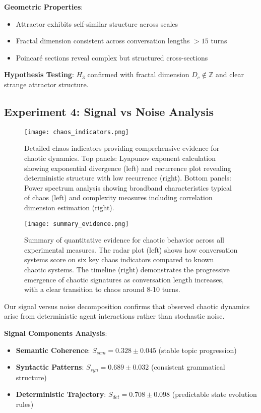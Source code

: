 \documentclass[11pt,a4paper]{article}
\begin{document}
\textbf{Geometric Properties}:
\begin{itemize}
    \item Attractor exhibits self-similar structure across scales
    \item Fractal dimension consistent across conversation lengths $> 15$ turns
    \item Poincaré sections reveal complex but structured cross-sections
\end{itemize}

\textbf{Hypothesis Testing}: $H_3$ confirmed with fractal dimension $D_c \notin \mathbb{Z}$ and clear strange attractor structure.

\subsection{Experiment 4: Signal vs Noise Analysis}

\begin{figure}[ht]
\centering
\texttt{[image: chaos\_indicators.png]}
\caption{Detailed chaos indicators providing comprehensive evidence for chaotic dynamics. Top panels: Lyapunov exponent calculation showing exponential divergence (left) and recurrence plot revealing deterministic structure with low recurrence (right). Bottom panels: Power spectrum analysis showing broadband characteristics typical of chaos (left) and complexity measures including correlation dimension estimation (right).}
\label{fig:chaos_indicators}
\end{figure}

\begin{figure}[ht]
\centering
\texttt{[image: summary\_evidence.png]}
\caption{Summary of quantitative evidence for chaotic behavior across all experimental measures. The radar plot (left) shows how conversation systems score on six key chaos indicators compared to known chaotic systems. The timeline (right) demonstrates the progressive emergence of chaotic signatures as conversation length increases, with a clear transition to chaos around 8-10 turns.}
\label{fig:summary}
\end{figure}

Our signal versus noise decomposition confirms that observed chaotic dynamics arise from deterministic agent interactions rather than stochastic noise.

\textbf{Signal Components Analysis}:
\begin{itemize}
    \item \textbf{Semantic Coherence}: $S_{sem} = 0.328 \pm 0.045$ (stable topic progression)
    \item \textbf{Syntactic Patterns}: $S_{syn} = 0.689 \pm 0.032$ (consistent grammatical structure)
    \item \textbf{Deterministic Trajectory}: $S_{det} = 0.708 \pm 0.098$ (predictable state evolution rules)
\end{itemize}
\end{document}
